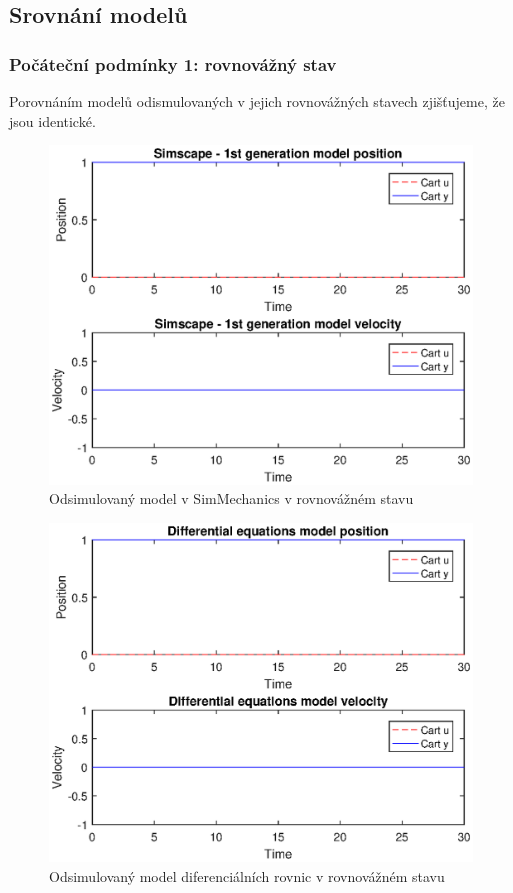 \subsection{Srovnání modelů}

\subsubsection{Počáteční podmínky 1: rovnovážný stav}

Porovnáním modelů odismulovaných v jejich rovnovážných stavech zjišťujeme, že jsou identické.

\begin{figure}[htbp]
	\centering
	\includegraphics[scale=0.7]{graphs/simscape1_rovnovaha.eps}
	\caption{Odsimulovaný model v SimMechanics v rovnovážném stavu}
\end{figure}
\FloatBarrier

\begin{figure}[htbp]
	\centering
	\includegraphics[scale=0.7]{graphs/differential_rovnovaha.eps}
	\caption{Odsimulovaný model diferenciálních rovnic v rovnovážném stavu}
\end{figure}
\FloatBarrier

